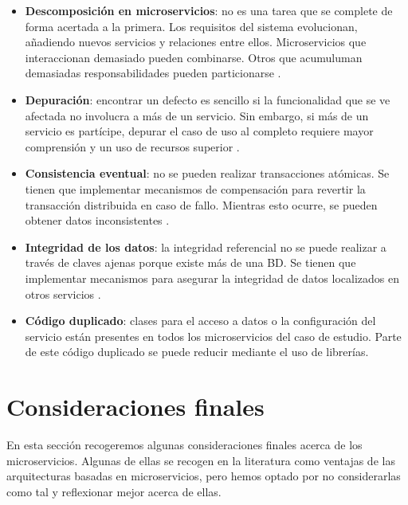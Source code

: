 \documentclass[11pt,spanish,listoffigures]{tfgetsinf}
\begin{document}
\begin{itemize}

\item \textbf{Descomposición en microservicios}: no es una tarea que se complete de forma acertada a la primera. Los requisitos del sistema evolucionan, añadiendo nuevos servicios y  relaciones entre ellos. Microservicios que interaccionan demasiado pueden combinarse. Otros que acumuluman demasiadas responsabilidades pueden particionarse \cite{Newman2015a, Lewis2014, DelaTorre2018}.

\item \textbf{Depuración}: encontrar un defecto es sencillo si la funcionalidad que se ve afectada no involucra a más de un servicio. Sin embargo, si más de un servicio es partícipe, depurar el caso de uso al completo requiere mayor comprensión y un uso de recursos superior \cite{Newman2015a}.

\item \textbf{Consistencia eventual}: no se pueden realizar transacciones atómicas. Se tienen que implementar mecanismos de compensación para revertir la transacción distribuida en caso de fallo. Mientras esto ocurre, se pueden obtener datos inconsistentes \cite{Newman2015a, DelaTorre2018, Lewis2014}.

\item \textbf{Integridad de los datos}: la integridad referencial no se puede realizar a través de claves ajenas porque existe más de una BD. Se tienen que implementar mecanismos para asegurar la integridad de datos localizados en otros servicios \cite{Newman2015a, DelaTorre2018}.

\item \textbf{Código duplicado}: clases para el acceso a datos o la configuración del servicio están presentes en todos los microservicios del caso de estudio. Parte de este código duplicado se puede reducir mediante el uso de librerías.

\end{itemize}

\section{Consideraciones finales}

En esta sección recogeremos algunas consideraciones finales acerca de los microservicios. Algunas de ellas se recogen en la literatura como ventajas de las arquitecturas basadas en microservicios, pero hemos optado por no considerarlas como tal y reflexionar mejor acerca de ellas.
\end{document}
